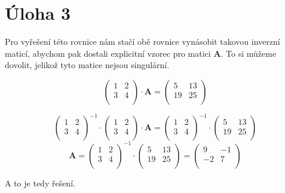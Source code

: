 \documentclass{fkssolpub}
\begin{document}
\section{Úloha 3}

Pro vyřešení této rovnice nám stačí obě rovnice vynásobit takovou inverzní maticí, abychom pak dostali explicitní vzorec pro matici $\mathbf{A}$. To si můžeme dovolit, jelikož tyto matice nejsou singulární.

\[
	\begin{pmatrix}
		1 & 2 \\
		3 & 4 \\
	\end{pmatrix} \cdot \mathbf{A} = \begin{pmatrix}
		5  & 13 \\
		19 & 25 \\
	\end{pmatrix}
\]

\[
	\begin{pmatrix}
		1 & 2 \\
		3 & 4 \\
	\end{pmatrix}^{-1} \cdot
	\begin{pmatrix}
		1 & 2 \\
		3 & 4 \\
	\end{pmatrix} \cdot \mathbf{A} = \begin{pmatrix}
		1 & 2 \\
		3 & 4 \\
	\end{pmatrix}^{-1} \cdot
	\begin{pmatrix}
		5  & 13 \\
		19 & 25 \\
	\end{pmatrix}
\]
\[
	\mathbf{A} = \begin{pmatrix}
		1 & 2 \\
		3 & 4 \\
	\end{pmatrix}^{-1} \cdot
	\begin{pmatrix}
		5  & 13 \\
		19 & 25 \\
	\end{pmatrix} =
	\begin{pmatrix}
		9  & -1 \\
		-2 & 7  \\
	\end{pmatrix}
\]

A to je tedy řešení.
\end{document}
